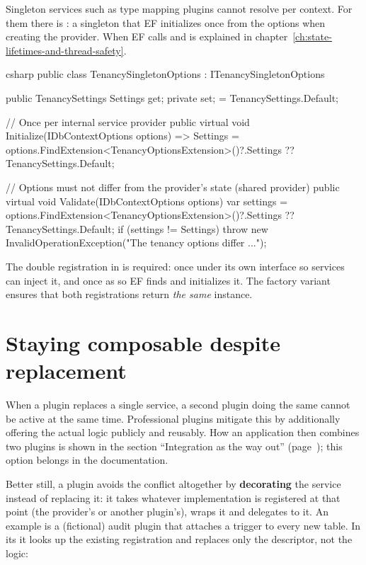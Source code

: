 Singleton services such as type mapping plugins cannot resolve
 per context. For them there is
: a singleton that EF initializes once from the options
when creating the provider. When EF calls  and  is explained
in chapter~\ref{ch:state-lifetimes-and-thread-safety}.

\begin{sourcecode}{csharp}
public class TenancySingletonOptions : ITenancySingletonOptions
{
    public TenancySettings Settings { get; private set; } = TenancySettings.Default;

    // Once per internal service provider
    public virtual void Initialize(IDbContextOptions options)
        => Settings = options.FindExtension<TenancyOptionsExtension>()?.Settings
                      ?? TenancySettings.Default;

    // Options must not differ from the provider's state (shared provider)
    public virtual void Validate(IDbContextOptions options)
    {
        var settings = options.FindExtension<TenancyOptionsExtension>()?.Settings
                       ?? TenancySettings.Default;
        if (settings != Settings)
            throw new InvalidOperationException("The tenancy options differ ...");
    }
}
\end{sourcecode}

The double registration in  is required: once under its own
interface so services can inject it, and once as  so EF
finds and initializes it. The factory variant ensures that both registrations return
\emph{the same} instance.

\section{Staying composable despite replacement}

When a plugin replaces a single service, a second plugin doing the same cannot be active at
the same time. Professional plugins mitigate this by additionally offering the actual logic
publicly and reusably. How an application then combines two plugins is shown in the section
“Integration as the way out” (page~\pageref{sec:integration-way-out}); this option belongs in
the documentation.

Better still, a plugin avoids the conflict altogether by \textbf{decorating} the service
instead of replacing it: it takes whatever implementation is registered at that point (the
provider's or another plugin's), wraps it and delegates to it. An example is a (fictional)
audit plugin that attaches a trigger to every new table. In its
 it looks up the existing registration and replaces only
the descriptor, not the logic:


